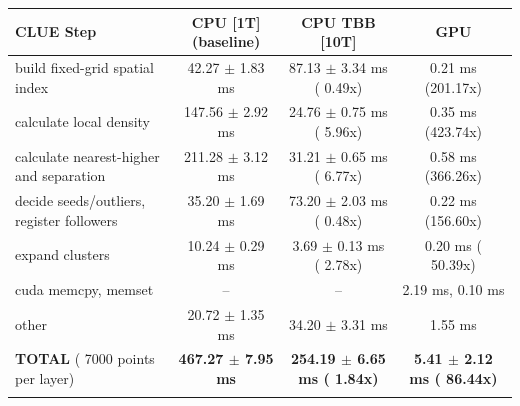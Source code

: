     \begin{tabular}{l|c|c|c}
    \hline
    CLUE Step                                 & CPU [1T] (baseline)         & CPU TBB [10T]                         & GPU                       \\ \hline
    build fixed-grid spatial index            &  42.27 $\pm$  1.83 ms       &  87.13 $\pm$  3.34 ms ( 0.49x)        &   0.21 ms (201.17x)       \\
    calculate local density                   & 147.56 $\pm$  2.92 ms       &  24.76 $\pm$  0.75 ms ( 5.96x)        &   0.35 ms (423.74x)       \\
    calculate nearest-higher and separation   & 211.28 $\pm$  3.12 ms       &  31.21 $\pm$  0.65 ms ( 6.77x)        &   0.58 ms (366.26x)       \\
    decide seeds/outliers, register followers &  35.20 $\pm$  1.69 ms       &  73.20 $\pm$  2.03 ms ( 0.48x)        &   0.22 ms (156.60x)       \\
    expand clusters                           &  10.24 $\pm$  0.29 ms       &   3.69 $\pm$  0.13 ms ( 2.78x)        &   0.20 ms ( 50.39x)       \\ \hline
    cuda memcpy, memset                       & --                          & --                                    &   2.19 ms,   0.10 ms      \\
    other                                     &  20.72 $\pm$  1.35 ms       &  34.20 $\pm$  3.31 ms                 &   1.55 ms                 \\ \hline
    \textbf{TOTAL} ( 7000 points per layer)   & \textbf{467.27 $\pm$  7.95 ms} & \textbf{254.19 $\pm$  6.65 ms ( 1.84x)} & \textbf{  5.41 $\pm$  2.12 ms ( 86.44x)}  \\
    \hline
    \multicolumn{4}{c}{}
    \end{tabular}
    \linebreak



